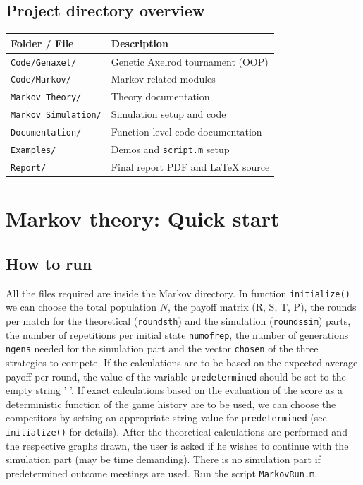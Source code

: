 \documentclass[12pt]{report}
\begin{document}
\subsection{Project directory overview}
\begin{tabular}{@{}ll@{}}
\toprule
\textbf{Folder / File} & \textbf{Description} \\
\midrule
\texttt{Code/Genaxel/} & Genetic Axelrod tournament (OOP) \\
\texttt{Code/Markov/} & Markov-related modules \\
\quad \texttt{Markov Theory/} & Theory documentation \\
\quad \texttt{Markov Simulation/} & Simulation setup and code \\
\texttt{Documentation/} & Function-level code documentation \\
\texttt{Examples/} & Demos and \texttt{script.m} setup \\
\texttt{Report/} & Final report PDF and LaTeX source \\
\bottomrule
\end{tabular}
\newpage
\section{Markov theory: Quick start}
\subsection{How to run}
All the files required are inside the Markov directory. In function \texttt{initialize()} we can choose the total population $N$, the payoff matrix (R, S, T, P), the rounds per match for the theoretical (\texttt{roundsth}) and the simulation (\texttt{roundssim}) parts, the number of repetitions per initial state \texttt{numofrep}, the number of generations \texttt{ngens} needed for the simulation part and the vector \texttt{chosen} of the three strategies to compete. If the calculations are to be based on the expected average payoff per round, the value of the variable \texttt{predetermined} should be set to the empty string ' '. If exact calculations based on the evaluation of the score as a deterministic function of the game history are to be used, we can choose the competitors by setting an appropriate string value for \texttt{predetermined} (see \texttt{initialize()} for details). After the theoretical calculations are performed and the respective graphs drawn, the user is asked if he wishes to continue with the simulation part (may be time demanding). There is no simulation part if predetermined outcome meetings are used. Run the script \texttt{MarkovRun.m}.
\end{document}
